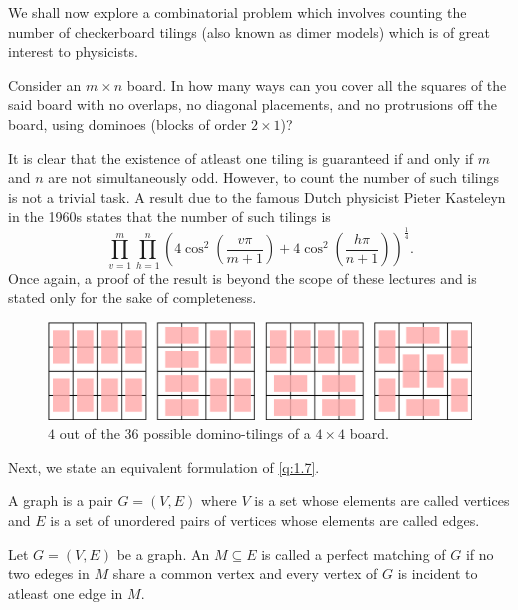 We shall now explore a combinatorial problem which involves counting the number of checkerboard tilings (also known as dimer models) which is of great interest to physicists. 

\begin{question}
	\label{q:1.7}
Consider an $m\times n$ board. In how many ways can you cover all the squares of the said board with no overlaps, no diagonal placements, and no protrusions off the board, using dominoes (blocks of order $2\times 1$)?
\end{question}

It is clear that the existence of atleast one tiling is guaranteed if and only if $m$ and $n$ are not simultaneously odd. However, to count the number of such tilings is not a trivial task. A result due to the famous Dutch physicist Pieter Kasteleyn in the 1960s states that the number of such tilings is
\[
	\prod_{v=1}^{m}\prod_{h=1}^{n}\left( 4\cos^2\left( \frac{v\pi}{m+1} \right) +4\cos^2\left( \frac{h\pi}{n+1} \right)  \right)^{\frac{1}{4}}.
	\label{KFormula}
\]
Once again, a proof of the result is beyond the scope of these lectures and is stated only for the sake of completeness.
\begin{figure}[H]
    \centering
    \includegraphics[scale=0.6]{Images/Figure1.jpg}
    \caption{$4$ out of the $36$ possible domino-tilings of a $4\times 4$ board.}
\end{figure}

Next, we state an equivalent formulation of \cref{q:1.7}.

\begin{definition}[Graph]
	A graph is a pair $G=\left( V,E \right)$ where $V$ is a set whose elements are called vertices and $E$ is a set of unordered pairs of vertices whose elements are called edges.
\end{definition}

\begin{definition}
Let $G=\left( V,E \right)$ be a graph. An $M\subseteq E$ is called a perfect matching of $G$ if no two edeges in $M$ share a common vertex and every vertex of $G$ is incident to atleast one edge in $M$.
\end{definition}

